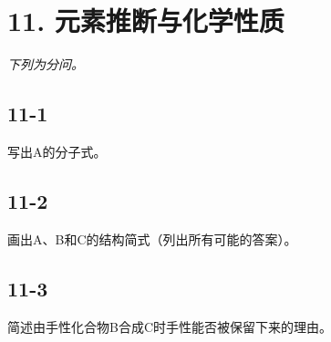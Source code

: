 \section*{11. 元素推断与化学性质}
\textit{下列为分问。}

\subsection*{11-1}
写出A的分⼦式。

\subsection*{11-2}
画出A、B和C的结构简式（列出所有可能的答案）。

\subsection*{11-3}
简述由⼿性化合物B合成C时⼿性能否被保留下来的理由。
